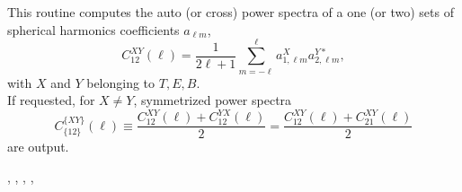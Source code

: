
\sloppy


\section[alm2cl*]{ }
\label{sub:alm2cl}
\author{Eric Hivon}

\begin{facility}
{This routine computes the auto (or cross) power spectra of a one (or two) sets of spherical harmonics
  coefficients $a_{\ell m}$,
\begin{equation}
\label{eq:alm2cla}
C_{12}^{XY}(\ell) = \frac{1}{2 \ell +1}
\sum_{m=-\ell}^{\ell} a_{1,\ell m}^X
  a_{2,\ell m}^{Y*},
\end{equation}
with $X$ and $Y$ belonging to $T,E,B$. \\
If requested, for $X \ne Y$, symmetrized power spectra
\begin{equation}
\label{eq:alm2clb}
  C_{\{12\}}^{\{XY\}}(\ell) \equiv \frac{C_{12}^{XY}(\ell)+C_{12}^{YX}(\ell)}{2} = \frac{C_{12}^{XY}(\ell)+C_{21}^{XY}(\ell)}{2}
\end{equation}
are output.


}
{\modAlmTools}
\end{facility}

\begin{f90format}
{%
, %
, %
,  %
, %
}
\end{f90format}
\aboutoptional

